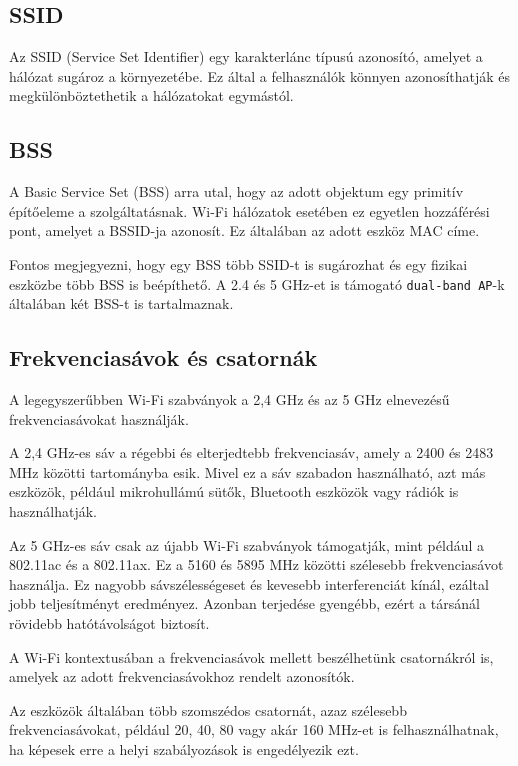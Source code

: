 \documentclass[12pt]{article}
\begin{document}
\subsection{SSID}

Az SSID (Service Set Identifier) egy karakterlánc típusú azonosító, amelyet a hálózat sugároz a környezetébe. Ez által a felhasználók könnyen azonosíthatják és megkülönböztethetik a hálózatokat egymástól.

\subsection{BSS}

A Basic Service Set (BSS) arra utal, hogy az adott objektum egy primitív építőeleme a szolgáltatásnak. Wi-Fi hálózatok esetében ez egyetlen hozzáférési pont, amelyet a BSSID-ja azonosít. Ez általában az adott eszköz MAC címe.

Fontos megjegyezni, hogy egy BSS több SSID-t is sugározhat és egy fizikai eszközbe több BSS is beépíthető. A 2.4 és 5 GHz-et is támogató \texttt{dual-band AP}-k általában két BSS-t is tartalmaznak.


\subsection{Frekvenciasávok és csatornák}

A legegyszerűbben Wi-Fi szabványok a 2,4 GHz és az 5 GHz elnevezésű frekvenciasávokat használják.

A 2,4 GHz-es sáv a régebbi és elterjedtebb frekvenciasáv, amely a 2400 és 2483 MHz közötti tartományba esik. Mivel ez a sáv szabadon használható, azt más eszközök, például mikrohullámú sütők, Bluetooth eszközök vagy rádiók is használhatják.

Az 5 GHz-es sáv csak az újabb Wi-Fi szabványok támogatják, mint például a 802.11ac és a 802.11ax. Ez a 5160 és 5895 MHz közötti szélesebb frekvenciasávot használja.
Ez nagyobb sávszélességeset és kevesebb interferenciát kínál, ezáltal jobb teljesítményt eredményez. Azonban terjedése gyengébb, ezért a társánál rövidebb hatótávolságot biztosít.

A Wi-Fi kontextusában a frekvenciasávok mellett beszélhetünk csatornákról is, amelyek az adott frekvenciasávokhoz rendelt azonosítók.

Az eszközök általában több szomszédos csatornát, azaz szélesebb frekvenciasávokat, például 20, 40, 80 vagy akár 160 MHz-et is felhasználhatnak, ha képesek erre a helyi szabályozások is engedélyezik ezt. \cite{wlan_channels}
\end{document}
